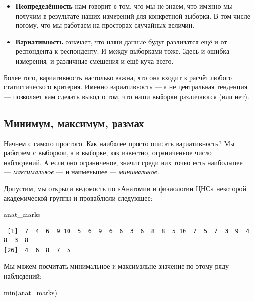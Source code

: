 \documentclass[
  letterpaper,
  DIV=11,
  numbers=noendperiod]{scrreprt}
\newenvironment{Shaded}{}{}
\newcommand{\FunctionTok}[1]{\textcolor[rgb]{0.44,0.26,0.76}{#1}}
\newcommand{\NormalTok}[1]{\textcolor[rgb]{0.14,0.16,0.18}{#1}}
\providecommand{\tightlist}{%
  \setlength{\itemsep}{0pt}\setlength{\parskip}{0pt}}\usepackage{longtable,booktabs,array}
\theoremstyle{definition}
\theoremstyle{remark}
\begin{document}
\begin{itemize}
\tightlist
\item
  \textbf{Неопределённость} нам говорит о том, что мы не знаем, что
  именно мы получим в результате наших измерений для конкретной выборки.
  В том числе потому, что мы работаем на просторах случайных величин.
\item
  \textbf{Вариативность} означает, что наши данные будут различатся ещё
  и от респондента к респонденту. И между выборками тоже. Здесь и ошибка
  измерения, и различные смешения и ещё куча всего.
\end{itemize}

Более того, вариативность настолько важна, что она входит в расчёт
любого статистического критерия. Именно вариативность --- а не
центральная тенденция --- позволяет нам сделать вывод о том, что наши
выборки различаются (или нет).

\subsection{Минимум, максимум, размах}\label{andan-descriptives-range}

Начнем с самого простого. Как наиболее просто описать вариативность? Мы
работаем с выборкой, а в выборке, как известно, ограниченное число
наблюдений. А если оно ограниченое, значит среди них точно есть
наибольшее --- \emph{максимальное} --- и наименьшее ---
\emph{минимальное}.

Допустим, мы открыли ведомость по «Анатомии и физиологии ЦНС» некоторой
академической группы и пронаблюли следующее:

\begin{Shaded}
\begin{Highlighting}[]
\NormalTok{anat\_marks}
\end{Highlighting}
\end{Shaded}

\begin{verbatim}
 [1]  7  4  6  9 10  5  6  9  6  6  3  6  8  8  5 10  7  5  7  3  9  4  8  3  8
[26]  4  6  8  7  5
\end{verbatim}

Мы можем посчитать минимальное и максимальне значение по этому ряду
наблюдений:

\begin{Shaded}
\begin{Highlighting}[]
\FunctionTok{min}\NormalTok{(anat\_marks)}
\end{Highlighting}
\end{Shaded}
\end{document}
